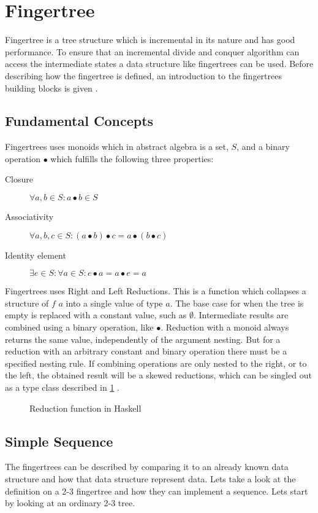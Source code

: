 \section{Fingertree}
Fingertree is a tree structure which is incremental in its nature and has good
performance. To ensure that an incremental divide and conquer algorithm can
access the intermediate states a data structure like fingertrees can be used.
Before describing how the fingertree is defined, an introduction to the
fingertrees building blocks is given \cite{fingertree}.

\subsection{Fundamental Concepts}

Fingertrees uses monoids which in abstract algebra is a set, $S$, and a binary
operation $\bullet$ which fulfills the following
three properties:
\begin{description}
\item[Closure] $\forall a,b \in S: a \bullet b \in S$
\item[Associativity] $\forall a,b,c \in S: (a \bullet b) \bullet c = a \bullet
    (b \bullet c)$ 
\item[Identity element] $\exists e \in S: \forall a \in S: e \bullet a = a
    \bullet e = a$
\end{description}

Fingertrees uses Right and Left Reductions. This is a function which
collapses a structure of $f$ $a$ into a single value of type $a$. The base case
for when the tree is empty is replaced with a constant value, such as 
$\emptyset$. Intermediate results are combined using a binary operation, like
$\bullet$. Reduction with a monoid always returns the same value,
independently of the argument nesting. But for a reduction with an arbitrary
constant and binary operation there must be a specified nesting rule. If
combining operations are only nested to the right, or to the left, the obtained
result will be a skewed reductions, which can be singled out as a type class
described in \cref{fig:Reduction} \cite{fingertree}.

\begin{figure}[h!]

\caption{Reduction function in Haskell \label{fig:Reduction}}
\end{figure}

\subsection{Simple Sequence}
The fingertrees can be described by comparing it to an already
known data structure and how that data structure represent data. Lets take a look
at the definition on a 2-3 fingertree and how they can implement a sequence.
Lets start by looking at an ordinary 2-3 tree.

